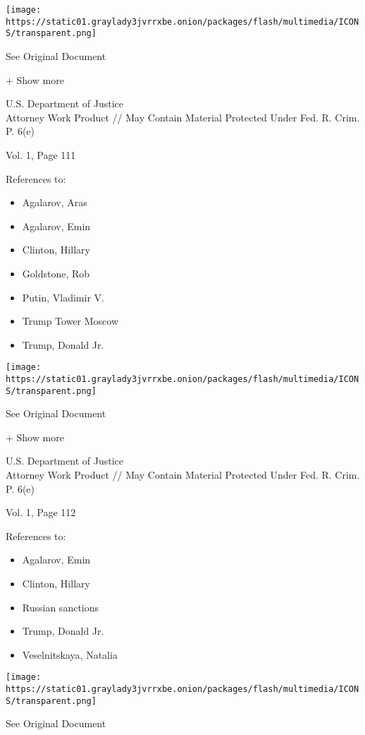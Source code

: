 \protect\hyperlink{}{}

\texttt{[image: https://static01.graylady3jvrrxbe.onion/packages/flash/multimedia/ICONS/transparent.png]}

See Original Document

+ Show more

U.S. Department of Justice\\
Attorney Work Product // May Contain Material Protected Under Fed. R.
Crim. P. 6(e)

Vol. 1, Page 111

References to:

\begin{itemize}
\tightlist
\item
  Agalarov, Aras
\item
  Agalarov, Emin
\item
  Clinton, Hillary
\item
  Goldstone, Rob
\item
  Putin, Vladimir V.
\item
  Trump Tower Moscow
\item
  Trump, Donald Jr.
\end{itemize}

\protect\hyperlink{}{}

\texttt{[image: https://static01.graylady3jvrrxbe.onion/packages/flash/multimedia/ICONS/transparent.png]}

See Original Document

+ Show more

U.S. Department of Justice\\
Attorney Work Product // May Contain Material Protected Under Fed. R.
Crim. P. 6(e)

Vol. 1, Page 112

References to:

\begin{itemize}
\tightlist
\item
  Agalarov, Emin
\item
  Clinton, Hillary
\item
  Russian sanctions
\item
  Trump, Donald Jr.
\item
  Veselnitskaya, Natalia
\end{itemize}

\protect\hyperlink{}{}

\texttt{[image: https://static01.graylady3jvrrxbe.onion/packages/flash/multimedia/ICONS/transparent.png]}

See Original Document

